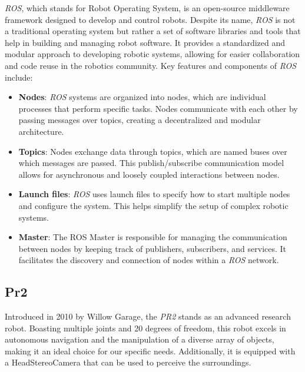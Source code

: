     \textit{ROS}, which stands for Robot Operating System, is an open-source middleware framework designed to develop and control robots. Despite its name, \textit{ROS} is not a traditional operating system but rather a set of software libraries and tools that help in building and managing robot software. It provides a standardized and modular approach to developing robotic systems, allowing for easier collaboration and code reuse in the robotics community.
    Key features and components of \textit{ROS} include:
    \begin{itemize}
        \item \textbf{Nodes}: \textit{ROS} systems are organized into nodes, which are individual processes that perform specific tasks. Nodes communicate with each other by passing messages over topics, creating a decentralized and modular architecture.
        \item \textbf{Topics}: Nodes exchange data through topics, which are named buses over which messages are passed. This publish/subscribe communication model allows for asynchronous and loosely coupled interactions between nodes.
        \item \textbf{Launch files}: \textit{ROS} uses launch files to specify how to start multiple nodes and configure the system. This helps simplify the setup of complex robotic systems.
        \item \textbf{Master}: The ROS Master is responsible for managing the communication between nodes by keeping track of publishers, subscribers, and services. It facilitates the discovery and connection of nodes within a \textit{ROS} network.
    \end{itemize}

    \subsection{Pr2}
	\label{sec:pr2}
	Introduced in 2010 by Willow Garage, the \textit{PR2} \cite{pr2} stands as an advanced research robot. Boasting multiple joints and 20 degrees of freedom, this robot excels in autonomous navigation and the manipulation of a diverse array of objects, making it an ideal choice for our specific needs. Additionally, it is equipped with a HeadStereoCamera that can be used to perceive the surroundings.
	
